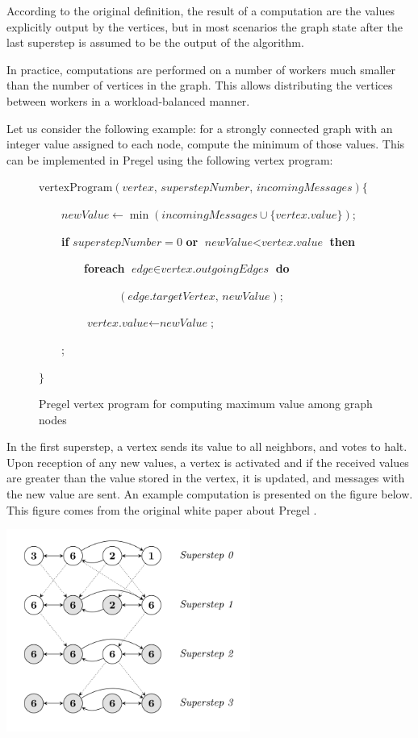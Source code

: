 \documentclass{pracamgr}
\theoremstyle{plain}
\theoremstyle{definition}
\theoremstyle{remark}
\begin{document}
According to the original definition, the result of a computation are the values explicitly output by the vertices, but in most scenarios the graph state after the last superstep is assumed to be the output of the algorithm.

In practice, computations are performed on a number of workers much smaller than the number of vertices in the graph. This allows distributing the vertices between workers in a workload-balanced manner.

Let us consider the following example: for a strongly connected graph with an integer value assigned to each node, compute the minimum of those values. This can be implemented in Pregel using the following vertex program:

\begin{figure}[h!]
\parbox{0.8\textwidth}{
$\text{vertexProgram}(\textit{vertex, superstepNumber, incomingMessages}) \{$

~~~~$\textit{newValue} \leftarrow \min(\textit{incomingMessages} \cup \{\textit{vertex.value}\})$;

~~~~\textbf{if} $superstepNumber = 0$ \textbf{or} $\textit{newValue} < \textit{vertex.value}$ \textbf{then}

~~~~~~~~\textbf{foreach} $\textit{edge} \in \textit{vertex.outgoingEdges}$ \textbf{do}

~~~~~~~~~~~~~~$(\textit{edge.targetVertex, newValue})$;

~~~~~~~~$\textit{vertex.value} \leftarrow \textit{newValue}$;

~~~~;

$\}$
}
\caption{Pregel vertex program for computing maximum value among graph nodes}
\end{figure}

In the first superstep, a vertex sends its value to all neighbors, and votes to halt. Upon reception of any new values, a vertex is activated and if the received values are greater than the value stored in the vertex, it is updated, and messages with the new value are sent. An example computation is presented on the figure below. This figure comes from the original white paper about Pregel \cite{pregel}.

\begin{center}
\includegraphics[width=0.6\textwidth]{PregelMaxVal.png}
\end{center}
\end{document}
